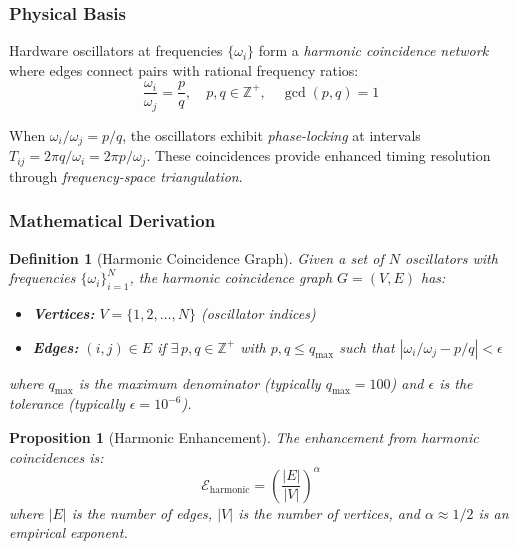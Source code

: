 \documentclass[twocolumn,10pt]{article}
\newtheorem{definition}[theorem]{Definition}
\newtheorem{proposition}[theorem]{Proposition}
\theoremstyle{remark}
\begin{document}
\subsubsection{Physical Basis}

Hardware oscillators at frequencies $\{\omega_i\}$ form a \textit{harmonic coincidence network} where edges connect pairs with rational frequency ratios:
\begin{equation}
    \frac{\omega_i}{\omega_j} = \frac{p}{q}, \quad p, q \in \mathbb{Z}^+, \quad \gcd(p, q) = 1
    \label{eq:harmonic_ratio}
\end{equation}

When $\omega_i/\omega_j = p/q$, the oscillators exhibit \textit{phase-locking} at intervals $T_{ij} = 2\pi q/\omega_i = 2\pi p/\omega_j$. These coincidences provide enhanced timing resolution through \textit{frequency-space triangulation}.

\subsubsection{Mathematical Derivation}

\begin{definition}[Harmonic Coincidence Graph]
\label{def:harmonic_graph}
Given a set of $N$ oscillators with frequencies $\{\omega_i\}_{i=1}^{N}$, the harmonic coincidence graph $G = (V, E)$ has:
\begin{itemize}
    \item \textbf{Vertices:} $V = \{1, 2, \ldots, N\}$ (oscillator indices)
    \item \textbf{Edges:} $(i, j) \in E$ if $\exists \, p, q \in \mathbb{Z}^+$ with $p, q \leq q_{\max}$ such that $|\omega_i/\omega_j - p/q| < \epsilon$
\end{itemize}
where $q_{\max}$ is the maximum denominator (typically $q_{\max} = 100$) and $\epsilon$ is the tolerance (typically $\epsilon = 10^{-6}$).
\end{definition}

\begin{proposition}[Harmonic Enhancement]
\label{prop:harmonic_enhancement}
The enhancement from harmonic coincidences is:
\begin{equation}
    \mathcal{E}_{\text{harmonic}} = \left(\frac{|E|}{|V|}\right)^{\alpha}
    \label{eq:harmonic_enhancement}
\end{equation}
where $|E|$ is the number of edges, $|V|$ is the number of vertices, and $\alpha \approx 1/2$ is an empirical exponent.
\end{proposition}
\end{document}

